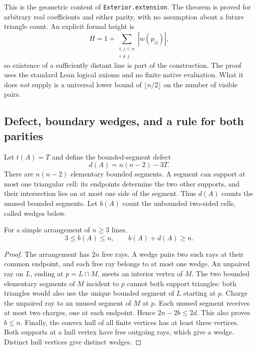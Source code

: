 This is the geometric content of \texttt{Exterior.extension}.  The theorem
is proved for arbitrary real coefficients and either parity, with no
assumption about a future triangle count.  An explicit formal height is
\[
  H=1+\sum_{\substack{i,j<n\\i\ne j}}|w(p_{ij})|,
\]
so existence of a sufficiently distant line is part of the construction.
The proof uses the standard Lean logical axioms and no finite native
evaluation.  What it does \emph{not} supply is a universal lower bound of
$\lfloor n/2\rfloor$ on the number of visible pairs.

\subsection{Defect, boundary wedges, and a rule for both parities}

Let $t(A)=T$ and define the bounded-segment defect
\begin{equation}
 d(A)=n(n-2)-3T.
 \label{ext:defect}
\end{equation}
There are $n(n-2)$ elementary bounded segments.  A segment can support at
most one triangular cell: its endpoints determine the two other supports,
and their intersection lies on at most one side of the segment.  Thus
$d(A)$ counts the unused bounded segments.  Let $b(A)$ count the unbounded
two-sided cells, called wedges below.

\begin{lemma}
\label{ext:charging}
For a simple arrangement of $n\geq3$ lines,
\[
  3\leq b(A)\leq n,\qquad b(A)+d(A)\geq n.
\]
\end{lemma}

\begin{proof}
The arrangement has $2n$ free rays.  A wedge pairs two such rays at their
common endpoint, and each free ray belongs to at most one wedge.  An
unpaired ray on $L$, ending at $p=L\cap M$, meets an interior vertex of
$M$.  The two bounded elementary segments of $M$ incident to $p$ cannot
both support triangles: both triangles would also use the unique bounded
segment of $L$ starting at $p$.  Charge the unpaired ray to an unused
segment of $M$ at $p$.  Each unused segment receives at most two charges,
one at each endpoint.  Hence $2n-2b\leq2d$.  This also proves $b\leq n$.
Finally, the convex hull of all finite vertices has at least three
vertices.  Both supports at a hull vertex have free outgoing rays, which
give a wedge.  Distinct hull vertices give distinct wedges.
\end{proof}

